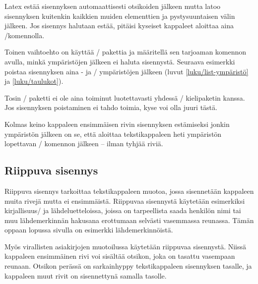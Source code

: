 Latex estää sisennyksen automaattisesti otsikoiden jälkeen mutta latoo
sisennyksen kuitenkin kaikkien muiden elementtien ja pystysuuntaisen
välin jälkeen. Jos sisennys halutaan estää, pitäisi kyseiset kappaleet
aloittaa aina \-/komennolla.

Toinen vaihtoehto on käyttää \-/ pakettia ja
määritellä sen tarjoaman komennon avulla, minkä ympäristöjen jälkeen ei
haluta sisennystä. Seuraava esimerkki poistaa sisennyksen aina
- ja \-/ ympäristöjen jälkeen (luvut
\ref{luku/list-ympäristö} ja \ref{luku/taulukot}).

\begin{koodilohkosis}
\end{koodilohkosis}

\noindent
Tosin \-/ paketti ei ole aina toiminut
luotettavasti yhdessä \-/ kielipaketin kanssa. Jos
sisennyksen poistaminen ei tahdo toimia, kyse voi olla juuri tästä.

Kolmas keino kappaleen ensimmäisen rivin sisennyksen estämiseksi jonkin
ympäristön jälkeen on se, että aloittaa tekstikappaleen heti ympäristön
lopettavan \-/ komennon jälkeen -- ilman tyhjää riviä.

\subsection{Riippuva sisennys}
\label{luku/riippuva-sisennys}

Riippuva sisennys tarkoittaa tekstikappaleen muotoa, jossa sisennetään
kappaleen muita rivejä mutta ei ensimmäistä. Riippuvaa sisennystä
käytetään esimerkiksi kirjallisuus\-/{} ja lähdeluetteloissa, joissa on
tarpeellista saada henkilön nimi tai muu lähdemerkinnän hakusana
erottumaan selvästi vasemmassa reunassa. Tämän oppaan lopussa sivulla
\pageref{luku/kirjallisuutta} on esimerkki lähdemerkinnöistä.

Myös virallisten asiakirjojen muotoilussa käytetään riippuvaa
sisennystä. Niissä kappaleen ensimmäinen rivi voi sisältää otsikon, joka
on tasattu vasempaan reunaan. Otsikon perässä on sarkainhyppy
tekstikappaleen sisennyksen tasalle, ja kappaleen muut rivit on
sisennettynä samalla tasolle.

